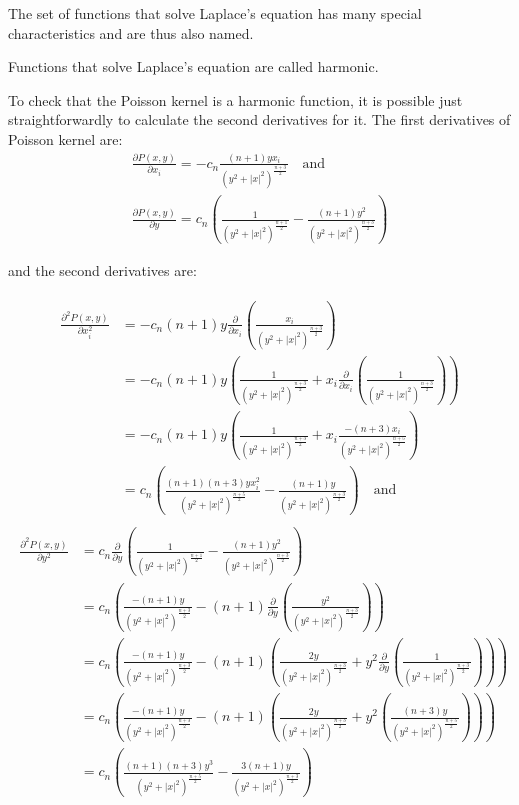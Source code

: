 The set of functions that solve Laplace's equation has many special characteristics and are thus also named.

\begin{definition}
    Functions that solve Laplace's equation are called harmonic.
\end{definition}

To check that the Poisson kernel is a harmonic function, it is possible just straightforwardly to calculate the second derivatives for it. The first derivatives of Poisson kernel are:
\begin{gather*}
    \frac{\partial P(x,y)}{\partial x_i}=-c_n\frac{(n+1)yx_i}{(y^2+|x|^2)^{\frac{n+3}{2}}}\quad\text{and}\\
    \frac{\partial P(x,y)}{\partial y}=c_n\left(\frac{1}{(y^2+|x|^2)^{\frac{n+1}{2}}}-\frac{(n+1)y^2}{(y^2+|x|^2)^{\frac{n+3}{2}}}\right)
\end{gather*}

\noindent and the second derivatives are:

\begin{align}\label{eq:d2dx2P}
\begin{split}
    \frac{\partial^2 P(x,y)}{\partial x_i^2}&=-c_n(n+1)y\frac{\partial}{\partial x_i}\left(\frac{x_i}{(y^2+|x|^2)^{\frac{n+3}{2}}}\right) \\
    &=-c_n(n+1)y\left(\frac{1}{(y^2+|x|^2)^{\frac{n+3}{2}}}+x_i\frac{\partial}{\partial x_i}\left(\frac{1}{(y^2+|x|^2)^{\frac{n+3}{2}}}\right) \right) \\
    &=-c_n(n+1)y\left(\frac{1}{(y^2+|x|^2)^{\frac{n+3}{2}}}+x_i\frac{-(n+3)x_i}{(y^2+|x|^2)^{\frac{n+5}{2}}}\right)\\
    &=c_n\left(\frac{(n+1)(n+3)yx_i^2}{(y^2+|x|^2)^{\frac{n+5}{2}}}-\frac{(n+1)y}{(y^2+|x|^2)^{\frac{n+3}{2}}} \right) \quad \text{and}
\end{split}
\end{align}
\begin{align}\label{eq:d2dyP}
\begin{split}
    \frac{\partial^2 P(x,y)}{\partial y^2}&=c_n\frac{\partial}{\partial y}\left(\frac{1}{(y^2+|x|^2)^{\frac{n+1}{2}}}-\frac{(n+1)y^2}{(y^2+|x|^2)^{\frac{n+3}{2}}}\right) \\
    &=c_n\left(\frac{-(n+1)y}{(y^2+|x|^2)^{\frac{n+3}{2}}}-(n+1)\frac{\partial}{\partial y}\left(\frac{y^2}{(y^2+|x|^2)^{\frac{n+3}{2}}} \right) \right) \\
    &=c_n\left(\frac{-(n+1)y}{(y^2+|x|^2)^{\frac{n+3}{2}}}-(n+1)\left(\frac{2y}{(y^2+|x|^2)^{\frac{n+3}{2}}}+y^2\frac{\partial}{\partial y}\left(\frac{1}{(y^2+|x|^2)^{\frac{n+3}{2}}}\right)\right)\right) \\
    &=c_n\left(\frac{-(n+1)y}{(y^2+|x|^2)^{\frac{n+3}{2}}}-(n+1)\left(\frac{2y}{(y^2+|x|^2)^{\frac{n+3}{2}}}+y^2\left(\frac{(n+3)y}{(y^2+|x|^2)^{\frac{n+5}{2}}}\right)\right)\right)  \\
    &=c_n\left(\frac{(n+1)(n+3)y^3}{(y^2+|x|^2)^{\frac{n+5}{2}}}-\frac{3(n+1)y}{(y^2+|x|^2)^{\frac{n+3}{2}}} \right)
\end{split}
\end{align}

